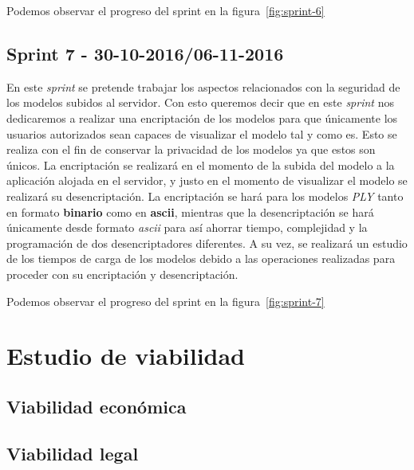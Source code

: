 Podemos observar el progreso del sprint en la figura~\ref{fig:sprint-6}

\subsection{Sprint 7 - 30-10-2016/06-11-2016}
En este \textit{sprint} se pretende trabajar los aspectos relacionados con la seguridad de los modelos subidos al servidor. Con esto queremos decir que en este \textit{sprint} nos dedicaremos a realizar una encriptación de los modelos para que únicamente los usuarios autorizados sean capaces de visualizar el modelo tal y como es. Esto se realiza con el fin de conservar la privacidad de los modelos ya que estos son únicos.
La encriptación se realizará en el momento de la subida del modelo a la aplicación alojada en el servidor, y justo en el momento de visualizar el modelo se realizará su desencriptación. La encriptación se hará para los modelos \textit{PLY} tanto en formato \textbf{binario} como en \textbf{ascii}, mientras que la desencriptación se hará únicamente desde formato \textit{ascii} para así ahorrar tiempo, complejidad y la programación de dos desencriptadores diferentes. A su vez, se realizará un estudio de los tiempos de carga de los modelos debido a las operaciones realizadas para proceder con su encriptación y desencriptación.

Podemos observar el progreso del sprint en la figura~\ref{fig:sprint-7}


\section{Estudio de viabilidad}

\subsection{Viabilidad económica}

\subsection{Viabilidad legal}


